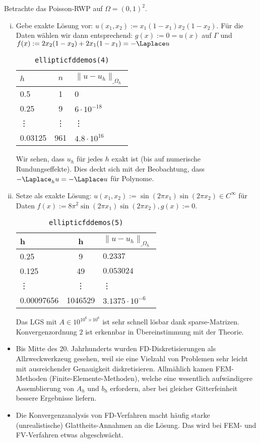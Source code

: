 \begin{ex*}
	Betrachte das Poisson-RWP auf $\Omega = (0,1)^2$.
	\begin{enumerate}[i)]
		\item
			Gebe exakte Lösung vor: $u(x_1, x_2) := x_1(1-x_1)x_2(1-x_2)$.
			Für die Daten wählen wir dann entsprechend: $g(x) := 0 = u(x)$ auf $\Gamma$ und $f(x) := 2x_2(1-x_2) + 2x_1(1-x_1) = -\Laplace u$
			\begin{table}
				\centering
				\begin{tabular}{l|c|l}
					$h$ & $n$ & $\|u - u_h\|_{\_\Omega_h}$ \\ \hline
					0.5 & 1 & 0 \\
					0.25 & 9 & $6 \cdot 10^{-18}$ \\
					\vdots & \vdots & \vdots \\
					0.03125 & 961 & $4.8 \cdot 10^{16}$
				\end{tabular}
				\caption{\texttt{elliptic\textunderscore fd\textunderscore demos(4)}}
			\end{table}
			Wir sehen, dass $u_h$ für jedes $h$ exakt ist (bis auf numerische Rundungseffekte).
			Dies deckt sich mit der Beobachtung, dass $-\Laplace_h u = - \Laplace u$ für Polynome.
		\item
			Setze als exakte Lösung: $u(x_1, x_2) := \sin(2\pi x_1) \sin(2\pi x_2) \in C^\infty$ für Daten $f(x) := 8\pi^2 \sin(2\pi x_1) \sin(2\pi x_2), g(x) := 0$.
			\begin{table}
				\centering
				\begin{tabular}{l|cl}
					h & h & $\|u - u_h\|_{\_\Omega_h}$ \\ \hline
					0.25 & 9 & $0.2337$ \\
					0.125 & 49 & $0.053024$ \\
					\vdots & \vdots & \vdots \\
					0.00097656 & 1046529 & $3.1375 \cdot 10^{-6}$
				\end{tabular}
				\caption{\texttt{elliptic\textunderscore fd\textunderscore demos(5)}}
			\end{table}
			Das LGS mit $A \in 10^{10^6 \times 10^6}$ ist sehr schnell lösbar dank sparse-Matrizen.
			Konvergenzordnung $2$ ist erkennbar in Übereinstimmung mit der Theorie.
	\end{enumerate}
\end{ex*}

\begin{note}
	\begin{itemize}
		\item
			Bis Mitte des 20. Jahrhunderts wurden FD-Diskretisierungen als Allzweckwerkzeug gesehen, weil sie eine Vielzahl von Problemen sehr leicht mit ausreichender Genauigkeit diskretisieren.
			Allmählich kamen FEM-Methoden (Finite-Elemente-Methoden), welche eine wesentlich aufwändigere Assemblierung von $A_h$ und $b_h$ erfordern, aber bei gleicher Gitterfeinheit bessere Ergebnisse liefern.
		\item
			Die Konvergenzanalysis von FD-Verfahren macht häufig starke (unrealistische) Glattheits-Annahmen an die Lösung.
			Das wird bei FEM- und FV-Verfahren etwas abgeschwächt.
	\end{itemize}
\end{note}
